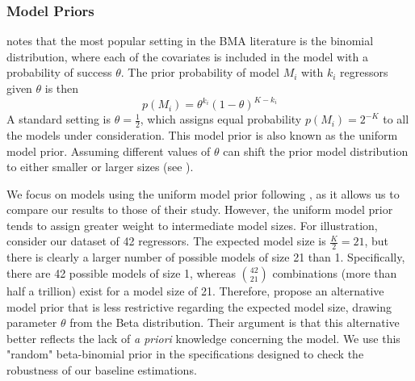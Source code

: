 \subsubsection{Model Priors}
\citet{MoralBenito2012} notes that the most popular setting in the \ac{BMA} literature is the binomial distribution, where each of the covariates is included in the model with a probability of success $\theta$. The prior probability of model $M_{i}$ with $k_{i}$ regressors given $\theta$ is then
\begin{equation}
	p(M_{i})=\theta^{k_{i}}(1-\theta)^{K-k_{i}}
\end{equation}
A standard setting is $\theta=\frac{1}{2}$, which assigns equal probability $p(M_{i}) = 2^{-K}$ to all the models under consideration. This model prior is also known as the uniform model prior. Assuming different values of $\theta$ can shift the prior model distribution to either smaller or larger sizes (see \citet{Zeugner2011}).

We focus on models using the uniform model prior following \citet{Fernandezetal2001}, as it allows us to compare our results to those of their study. However, the uniform model prior tends to assign greater weight to intermediate model sizes. For illustration, consider our dataset of 42 regressors. The expected model size is $\frac{K}{2} = 21$, but there is clearly a larger number of possible models of size 21 than 1. Specifically, there are 42 possible models of size 1, whereas ${42\choose 21}$ combinations (more than half a trillion) exist for a model size of 21. Therefore, \citet{LeySteel2009} propose an alternative model prior that is less restrictive regarding the expected model size, drawing parameter $\theta$ from the Beta distribution. Their argument is that this alternative better reflects the lack of \textit{a priori} knowledge concerning the model. We use this "random" beta-binomial prior in the specifications designed to check the robustness of our baseline estimations.

